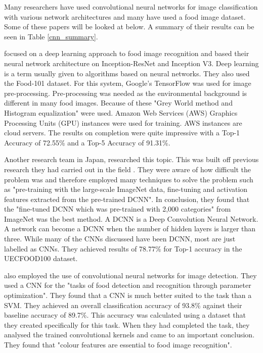 Many researchers have used convolutional neural networks for image
classification with various network architectures and many have used a food image dataset.
Some of these papers will be looked at below.
A summary of their results can be seen in Table \ref{cnn_summary}.

\parencite{deepLearning} focused on a deep learning approach to food image recognition  and based
their neural network architecture on Inception-ResNet and Inception V3.
Deep learning is a term usually given to algorithms based on neural networks.
They also used the Food-101 dataset. For this system, Google's
TensorFlow was used for image pre-processing. Pre-processing was needed as the
environmental background is different in many food images. Because of these
"Grey World method and Histogram equalization" \parencite{deepLearning} were
used.
Amazon Web Services (AWS) Graphics Processing Units (GPU) instances were used for training.
AWS instances are cloud servers.
The results on completion were quite impressive with a Top-1 Accuracy of 72.55\% and a Top-5 Accuracy of 91.31\%.

Another research team in Japan, \parencite{yanaiFood} researched this topic. This was built off previous research they had carried out in the field \parencite{kawano2014food}.
They were aware of how
difficult the problem was and therefore employed many techniques to solve the
problem such as "pre-training with the large-scale ImageNet data, fine-tuning
and activation features extracted from the pre-trained DCNN". 
In conclusion, they found that the "fine-tuned DCNN which was pre-trained
with 2,000 categories" from ImageNet was the best method. A
DCNN is a Deep Convolution Neural Network. 
A network can become a DCNN when the number of hidden layers is larger than three.
While many of the CNNs discussed have been DCNN, most are just labelled as CNNs.
They achieved results of 78.77\% for Top-1 accuracy in the UECFOOD100 dataset.

\parencite{kagayaFood} also employed the use of convolutional neural networks for
image detection. They used a CNN for the "tasks of food detection and recognition
through parameter optimization".
They found that a CNN is much better suited to the task than a SVM. They achieved an overall classification accuracy of 93.8\%
against their baseline accuracy of 89.7\%. This accuracy
was calculated using a dataset that they created specifically for this task.
When they had completed the task, they analysed the trained convolutional kernels
and came to an important conclusion. They found that "colour features are
essential to food image recognition".

